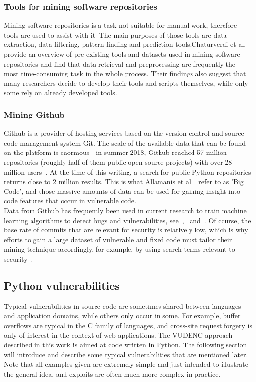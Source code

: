 \documentclass[
a4paper,
pagesize,
pdftex,
12pt,
twoside, %
BCOR=5mm, %
ngerman,
fleqn,
final,
]{scrartcl}
\begin{document}
	\subsubsection{Tools for mining software repositories}
	Mining software repositories is a task not suitable for manual work, therefore tools are used to assist with it. The main purposes of those tools are data extraction, data filtering, pattern finding and prediction tools.Chaturverdi et al.~\cite{Chaturvedi.2013} provide an overview of pre-existing tools and datasets used in mining software repositories and find that data retrieval and preprocessing are frequently the most time-consuming task in the whole process. Their findings also suggest that many researchers decide to develop their tools and scripts themselves, while only some rely on already developed tools. 
	\subsubsection{Mining Github}
	Github is a provider of hosting services based on the version control and source code management system Git. The scale of the available data that can be found on the platform is enormous - in summer 2018, Github reached 57 million repositories (roughly half of them public open-source projects) with over 28 million users~\cite{Github.com.b}. At the time of this writing, a search for public Python repositories returns close to 2 million results. This is what Allamanis et al.~\cite{Allamanis.2018} refer to as 'Big Code', and those massive amounts of data can be used for gaining insight into code features that occur in vulnerable code.\\
	Data from Github has frequently been used in current research to train machine learning algorithms to detect bugs and vulnerabilities, see~\cite{Zhou.2017},~\cite{Russell.2018} and~\cite{Liu.2018}. Of course, the base rate of commits that are relevant for security is relatively low, which is why efforts to gain a large dataset of vulnerable and fixed code must tailor their mining technique accordingly, for example, by using search terms relevant to security~\cite{Zhou.2017}.
	
	\subsection{Python vulnerabilities}
	
	Typical vulnerabilities in source code are sometimes shared between languages and application domains, while others only occur in some. For example, buffer overflows are typical in the C family of languages, and cross-site request forgery is only of interest in the context of web applications. The VUDENC approach described in this work is aimed at code written in Python. The following section will introduce and describe some typical vulnerabilities that are mentioned later. Note that all examples given are extremely simple and just intended to illustrate the general idea, and exploits are often much more complex in practice.
	
\end{document}
